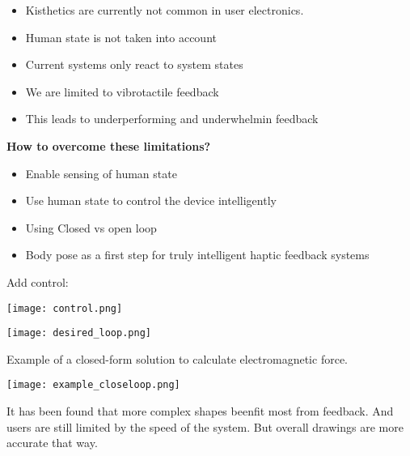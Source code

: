 \begin{itemize}[itemsep=-5pt, topsep=0pt, leftmargin=*]
	\item Kisthetics are currently not common in user electronics. 
	\item Human state is not taken into account
	\item Current systems only react to system states
	\item We are limited to vibrotactile feedback
	\item This leads to underperforming and underwhelmin feedback
\end{itemize} \medskip


\textbf{How to overcome these limitations?}


\begin{itemize}[itemsep=-5pt, topsep=0pt, leftmargin=*]
	\item Enable sensing of human state
	\item Use human state to control the device intelligently
	\item Using Closed vs open loop
	\item Body pose as a first step for truly intelligent haptic feedback systems
\end{itemize} \medskip

Add control:
\begin{center}
	\texttt{[image: control.png]}
\end{center}

\begin{center}
	\texttt{[image: desired\_loop.png]}
\end{center}

\medskip

Example of a closed-form solution to calculate electromagnetic force.
\begin{center}
	\texttt{[image: example\_closeloop.png]}
\end{center}

It has been found that more complex shapes beenfit most from feedback. And users are still limited by the speed of the system. 
But overall drawings are more accurate that way. 
